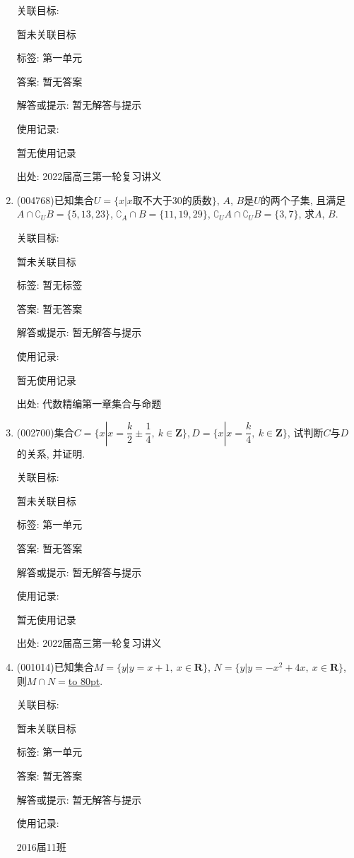 \documentclass[10pt,a4paper]{article}
\newcommand{\blank}[1]{\underline{\hbox to #1pt{}}}
\begin{document}
\begin{enumerate}[1.]
关联目标:

暂未关联目标



标签: 第一单元

答案: 暂无答案

解答或提示: 暂无解答与提示

使用记录:

暂无使用记录


出处: 2022届高三第一轮复习讲义
\item { (004768)}已知集合$U =\{x|x\text{取不大于}30\text{的质数}\}$, $A$, $B$是$U$的两个子集, 且满足$A\cap \complement_UB=\{5,13,23\}$, $\complement_A\cap B=\{11,19,29\}$, $\complement_UA\cap \complement_UB=\{3,7\}$, 求$A$, $B$.


关联目标:

暂未关联目标



标签: 暂无标签

答案: 暂无答案

解答或提示: 暂无解答与提示

使用记录:

暂无使用记录


出处: 代数精编第一章集合与命题
\item { (002700)}集合$C=\{x|x=\dfrac k2\pm \dfrac14, \ k\in \mathbf{Z}\},D=\{x|x=\dfrac k4,\ k\in \mathbf{Z}\}$, 试判断$C$与$D$的关系, 并证明.


关联目标:

暂未关联目标



标签: 第一单元

答案: 暂无答案

解答或提示: 暂无解答与提示

使用记录:

暂无使用记录


出处: 2022届高三第一轮复习讲义
\item { (001014)}已知集合$M=\{y|y=x+1, \ x \in \mathbf{R}\}$, $N=\{y|y=-x^2+4x,\  x \in \mathbf{R}\}$,
则$M \cap N=$\blank{80}.


关联目标:

暂未关联目标



标签: 第一单元

答案: 暂无答案

解答或提示: 暂无解答与提示

使用记录:

2016届11班	


\end{enumerate}
\end{document}

